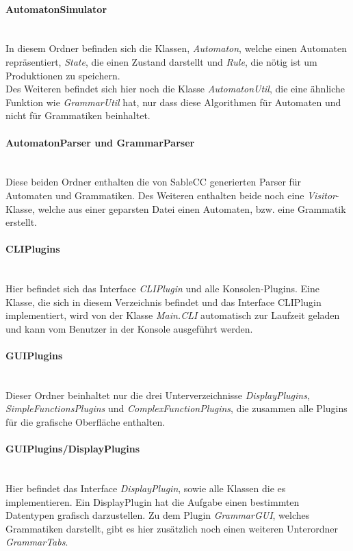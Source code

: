 \paragraph{AutomatonSimulator}\ \\
In diesem Ordner befinden sich die Klassen, \textit{Automaton}, welche einen Automaten repräsentiert, \textit{State}, die einen Zustand darstellt und \textit{Rule}, die nötig ist um Produktionen zu speichern.\\
Des Weiteren befindet sich hier noch die Klasse \textit{AutomatonUtil}, die eine ähnliche Funktion wie \textit{GrammarUtil} hat, nur dass diese Algorithmen für Automaten und nicht für Grammatiken beinhaltet.
\paragraph{AutomatonParser und GrammarParser}\ \\
Diese beiden Ordner enthalten die von SableCC generierten Parser für Automaten und Grammatiken. Des Weiteren enthalten beide noch eine \textit{Visitor}-Klasse, welche aus einer geparsten Datei einen Automaten, bzw. eine Grammatik erstellt.
\paragraph{CLIPlugins}\ \\
Hier befindet sich das Interface \textit{CLIPlugin} und alle Konsolen-Plugins. Eine Klasse, die sich in diesem Verzeichnis befindet und das Interface CLIPlugin implementiert, wird von der Klasse \textit{Main.CLI} automatisch zur Laufzeit geladen und kann vom Benutzer in der Konsole ausgeführt werden.
\paragraph{GUIPlugins}\ \\
Dieser Ordner beinhaltet nur die drei Unterverzeichnisse \textit{DisplayPlugins}, \textit{SimpleFunctionsPlugins} und \textit{ComplexFunctionPlugins}, die zusammen alle Plugins für die grafische Oberfläche enthalten.
\paragraph{GUIPlugins/DisplayPlugins}\ \\
Hier befindet das Interface \textit{DisplayPlugin}, sowie alle Klassen die es implementieren. Ein DisplayPlugin hat die Aufgabe einen bestimmten Datentypen grafisch darzustellen. Zu dem Plugin \textit{GrammarGUI}, welches Grammatiken darstellt, gibt es hier zusätzlich noch einen weiteren Unterordner \textit{GrammarTabs}.

